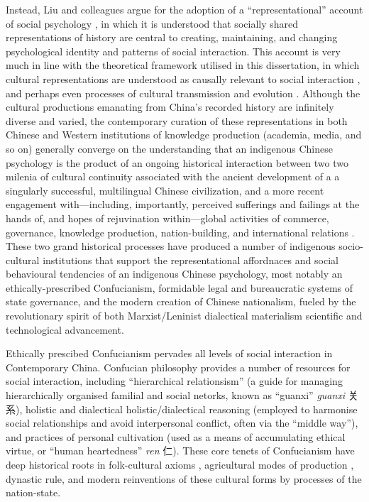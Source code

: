 {%
Instead, Liu and colleagues argue for the adoption of a ``representational'' account of social psychology \citep{Liu2005}, in which it is understood that socially shared representations of history are central to creating, maintaining, and changing psychological identity and patterns of social interaction.  This account is very much in line with the theoretical framework utilised in this dissertation, in which cultural representations are understood as causally relevant to social interaction \citep{Vesper2017}, and perhaps even processes of cultural transmission and evolution \citep{Claidiere2014}.  Although the cultural productions emanating from China's recorded history are infinitely diverse and varied, the contemporary curation of these representations in both Chinese and Western institutions of knowledge production (academia, media, and so on) generally converge on the understanding that an indigenous Chinese psychology is the product of an ongoing historical interaction between two two milenia of cultural continuity associated with the ancient development of a a singularly successful, multilingual Chinese civilization, and a more recent engagement with---including, importantly, perceived sufferings and failings at the hands of, and hopes of rejuvination within---global activities of commerce, governance, knowledge production, nation-building, and international relations \citep{Liu2009,Barme2009}.  These two grand historical processes have produced a number of indigenous socio-cultural institutions that support the representational affordnaces and social behavioural tendencies of an indigenous Chinese psychology, most notably an ethically-prescribed Confucianism, formidable legal and bureaucratic systems of state governance, and the modern creation of Chinese nationalism, fueled by the revolutionary spirit of both Marxist/Leninist dialectical materialism scientific and technological advancement.

Ethically prescibed Confucianism pervades all levels of social interaction in Contemporary China. Confucian philosophy provides a number of resources for social interaction, including ``hierarchical relationsism'' (a guide for managing hierarchically organised familial and social netorks, known as ``guanxi'' \textit{guanxi} 关系), holistic and dialectical holistic/dialectical reasoning (employed to harmonise social relationships and avoid interpersonal conflict, often via the ``middle way''), and practices of personal cultivation (used as a means of accumulating ethical virtue, or ``human heartedness'' \textit{ren} 仁).   These core tenets of Confucianism have deep historical roots in folk-cultural axioms \citep{Wang2009}, agricultural modes of production \citep{Talhelm2014,Fei1992}, dynastic rule, and modern reinventions of these cultural forms by processes of the nation-state\citep{Hwang1999,Liu2014}.

}
